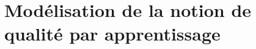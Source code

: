 
\lhead[\fancyplain{}{\leftmark}]%
{\fancyplain{}{}} %
\chead[\fancyplain{}{}]%
{\fancyplain{}{}}
\rhead[\fancyplain{}{}]%
{\fancyplain{}{\rightmark}}%
\lfoot[\fancyplain{}{}]%
{\fancyplain{}{}}
\cfoot[\fancyplain{}{\thepage}]%
{\fancyplain{}{\thepage}} %
\rfoot[\fancyplain{}{}]%
{\fancyplain{}{\scriptsize}}



\chapter{Modélisation de la notion de qualité par apprentissage}
\label{ch:metric_learning}

%
%


